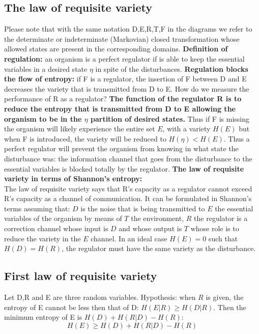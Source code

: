 \subsection{The law of requisite variety}
Please note that with the same notation D,E,R,T,F in the diagrams we refer to
 the determinate or indeterminate (Markovian) closed transformation whose
allowed states are present in the corresponding domains.
\textbf{Definition of regulation:} an organism is a perfect regulator if
is able to keep the essential variables in a desired state $\eta$ in spite
of the disturbances.
\textbf{Regulation blocks the flow of entropy: } if F is a regulator, the insertion
of F between D and E decreases the variety that is transmitted from D to E.
How do we measure the performance of R as a regulator?
\textbf{The function of the regulator R is to reduce the entropy that is transmitted
 from D to E allowing the organism to be in the $\eta$ partition of desired states.}
Thus if F is missing the organism will likely experience the entire set $E$, with
a variety $H(E)$ but when F is introduced, the variety will be reduced to $H(\eta)<H(E)$.
Thus a perfect regulator will prevent the organism from knowing in what state the
disturbance was: the information channel that goes from the disturbance to the
essential variables is blocked totally by the regulator.
\textbf{The law of requisite variety in terms of Shannon's entropy:}\\
The law of requisite variety says that R's capacity as a regulator cannot
exceed R's capacity as a channel of communication.
It can be formulated in Shannon's terms assuming that: $D$ is the noise that is
 being transmitted to $E$ the essential variables of the organism by means of $T$
the environment, $R$ the regulator is a correction channel whose input is $D$ and
whose output is $T$ whose role is to reduce the variety in the $E$ channel.
In an ideal case $H(E)=0$ such that $H(D)=H(R)$, the regulator must have
the same variety as the disturbance.


\subsection{First law of requisite variety}
Let D,R and E are three random variables.
Hypothesis: when $R$ is given, the entropy of E cannot be less then that of D: $H(E|R)\geq H(D|R)$.
Then the minimum entropy of E is $H(D)+H(R|D)-H(R)$:
\begin{equation}
H(E)\geq H(D)+H(R|D)-H(R) \label{variety:eq:minh}
\end{equation}
